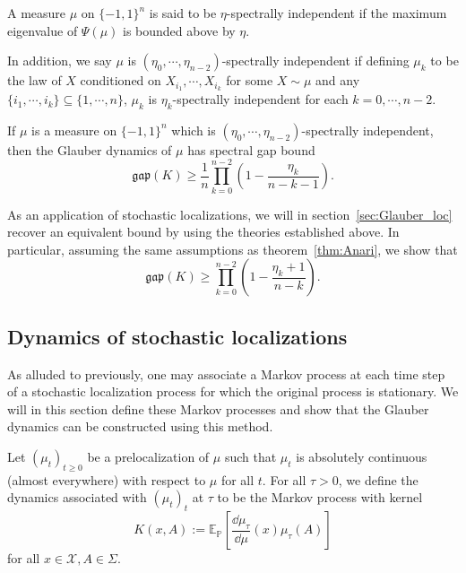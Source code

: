 \begin{definition}
  A measure \(\mu\) on \(\{-1, 1\}^n\) is said to be \(\eta\)-spectrally independent if 
  the maximum eigenvalue of \(\Psi(\mu)\) is bounded above by \(\eta\).

  In addition, we say \(\mu\) is \((\eta_0, \cdots, \eta_{n - 2})\)-spectrally independent if defining 
  \(\mu_k\) to be the law of \(X\) conditioned on \(X_{i_1}, \cdots, X_{i_k}\) for some \(X \sim \mu\) and 
  any \(\{i_1, \cdots, i_k\} \subseteq \{1, \cdots, n\}\), \(\mu_k\) is \(\eta_k\)-spectrally independent 
  for each \(k = 0, \cdots, n - 2\).
\end{definition}

\begin{theorem}\label{thm:Anari}
  If \(\mu\) is a measure on \(\{-1, 1\}^n\) which is \((\eta_0, \cdots, \eta_{n - 2})\)-spectrally 
  independent, then the Glauber dynamics of \(\mu\) has spectral gap bound 
  \[\mathfrak{gap}(K) \ge \frac{1}{n} \prod_{k = 0}^{n - 2}\left(1 - \frac{\eta_k}{n - k - 1}\right).\]
\end{theorem}

As an application of stochastic localizations, we will in section~\ref{sec:Glauber_loc} recover an equivalent 
bound by using the theories established above. In particular, assuming the same assumptions as theorem~\ref{thm:Anari},
we show that 
\[\mathfrak{gap}(K) \ge \prod_{k = 0}^{n - 2}\left(1 - \frac{\eta_k + 1}{n - k}\right).\]


\subsection{Dynamics of stochastic localizations}

As alluded to previously, one may associate a Markov process at each time step of a stochastic 
localization process for which the original process is stationary. We will in this section define 
these Markov processes and show that the Glauber dynamics can be constructed using this method. 

\begin{definition}
  Let \((\mu_t)_{t \ge 0}\) be a prelocalization of \(\mu\) such that \(\mu_t\) is absolutely 
  continuous (almost everywhere) with respect to \(\mu\) for all \(t\). For all \(\tau > 0\), we define the dynamics 
  associated with \((\mu_t)_t\) at \(\tau\) to be the Markov process with kernel 
  \[K(x, A) := \mathbb{E}_\mathbb{P}\left[\frac{\dd \mu_\tau}{\dd \mu}(x) \mu_\tau(A)\right]\]
  for all \(x \in \mathcal{X}, A \in \Sigma\).
\end{definition}

